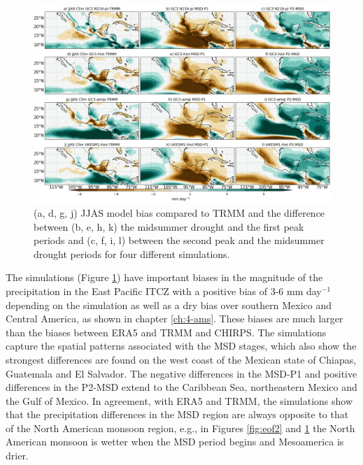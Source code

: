  
\begin{figure}[t!]
\includegraphics[width=\linewidth]{figures/fig2obs_prmodels3.png}
\caption[Composite mean precipitation biases and seasonal variations]{ (a, d, g, j) JJAS model bias compared to TRMM and the difference between  (b, e, h, k)  the midsummer drought and the first peak periods and (c, f, i, l)  between the second peak and the midsummer drought periods for four different simulations.}
\label{fig:model_pr}
\end{figure} 
 
The simulations (Figure \ref{fig:model_pr}) have important biases in the magnitude of the  precipitation in the East Pacific ITCZ with a positive bias of 3-6 mm day$^{-1}$ depending on the simulation as well as a dry bias over southern Mexico and Central America, as shown in chapter \ref{ch:4-ams}. These biases are much larger than the biases between ERA5 and TRMM and CHIRPS.
The simulations capture the spatial patterns associated with the MSD stages, which also show the strongest differences are found on the west coast of the Mexican state of Chiapas, Guatemala and El Salvador. The negative differences in the MSD-P1 and positive differences in the P2-MSD extend to the Caribbean Sea, northeastern Mexico and the Gulf of Mexico. 
In agreement, with ERA5 and TRMM, the simulations show that the precipitation differences in the MSD region are always opposite to that of the North American monsoon region, e.g., in Figures \ref{fig:eof2} and \ref{fig:model_pr} the North American monsoon is wetter when the MSD period begins and Mesoamerica is drier.
  
 
 
